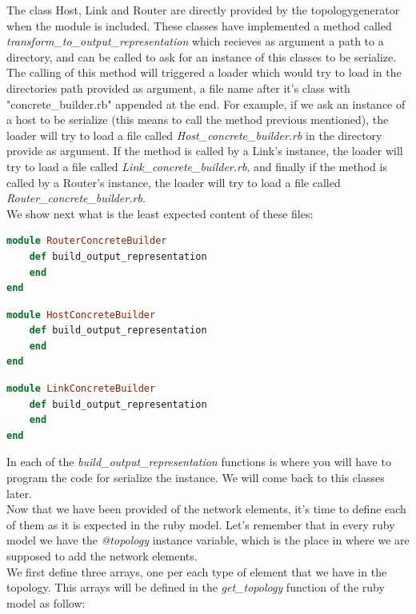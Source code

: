 The class Host, Link and Router are directly provided by the topologygenerator when the module is included. These classes have implemented a method called \textit{transform\_to\_output\_representation} which recieves as argument a path to a directory, and can be called to ask for an instance of this classes to be serialize. The calling of this method will triggered a loader which would try to load in the directories path provided as argument, a file name after it's class with "concrete\_builder.rb" appended at the end. For example, if we ask an instance of a host to be serialize (this means to call the method previous mentioned), the loader will try to load a file called \textit{Host\_concrete\_builder.rb} in the directory provide as argument. If the method is called by a Link's instance, the loader will try to load a file called \textit{Link\_concrete\_builder.rb}, and finally if the method is called by a Router's instance, the loader will try to load a file called \textit{Router\_concrete\_builder.rb}.\\
We show next what is the least expected content of these files:
\begin{lstlisting}[language=Ruby,breaklines=true,title=Router\_concrete\_builder.rb]
module RouterConcreteBuilder    
    def build_output_representation
    end      
end
\end{lstlisting}

\begin{lstlisting}[language=Ruby,breaklines=true,title=Host\_concrete\_builder.rb]
module HostConcreteBuilder    
    def build_output_representation
    end      
end
\end{lstlisting}

\begin{lstlisting}[language=Ruby,breaklines=true,title=Link\_concrete\_builder.rb]
module LinkConcreteBuilder    
    def build_output_representation
    end      
end
\end{lstlisting}

In each of the \textit{build\_output\_representation} functions is where you will have to program the code for serialize the instance. We will come back to this classes later. \\

Now that we have been provided of the network elements, it's time to define each of them as it is expected in the ruby model. Let's remember that in every ruby model we have the \textit{@topology} instance variable, which is the place in where we are supposed to add the network elements.\\
We first define three arrays, one per each type of element that we have in the topology. This arrays will be defined in the \textit{get\_topology} function of the ruby model as follow:

